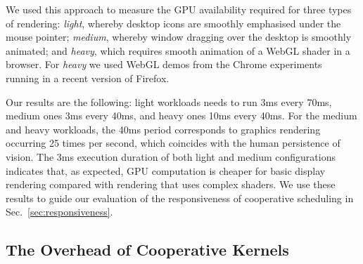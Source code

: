 \documentclass[parskip=half,sigconf,review, anonymous=true, acmcopyrightmode=none]{acmart}
\newcommand{\mytablong}{Table~}
\newcommand{\mysec}{Sec.~}
\begin{document}
We used this approach to measure the GPU availability required for three
types of rendering: \emph{light}, whereby desktop icons are smoothly
emphasised under the mouse pointer; \emph{medium}, whereby window
dragging over the desktop is smoothly animated; and \emph{heavy}, which
requires smooth animation of a WebGL shader in a browser.  For
\emph{heavy} we used WebGL demos from the Chrome
experiments~\cite{chrome-experiments} running
in a recent version of Firefox.



Our results are the following: light workloads needs to run 3ms every
70ms, medium ones 3ms every 40ms, and heavy ones 10ms every 40ms. For
the medium and heavy workloads, the 40ms period corresponds to graphics
rendering occurring 25 times per second, which coincides with the human
persistence of vision. The 3ms execution duration of both light and
medium configurations indicates that, as expected, GPU computation is
cheaper for basic display rendering compared with rendering that uses
complex shaders. We use these results to guide our evaluation of the
responsiveness of cooperative scheduling in
\mysec\ref{sec:responsiveness}.



\subsection{The Overhead of Cooperative Kernels}\label{sec:overhead}
\end{document}
